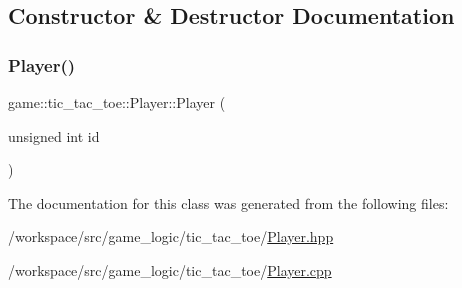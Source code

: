 \subsection{Constructor \& Destructor Documentation}
\mbox{\label{classgame_1_1tic__tac__toe_1_1_player_ac9259561465521842ee71a5a0ebd4896}} 
\subsubsection{\texorpdfstring{Player()}{Player()}}
{\footnotesize\ttfamily game\+::tic\+\_\+tac\+\_\+toe\+::\+Player\+::\+Player (\begin{DoxyParamCaption}\item[{unsigned int}]{id }\end{DoxyParamCaption})\hspace{0.3cm}{\ttfamily [explicit]}}



The documentation for this class was generated from the following files\+:\begin{DoxyCompactItemize}
\item 
/workspace/src/game\+\_\+logic/tic\+\_\+tac\+\_\+toe/\hyperlink{_player_8hpp}{Player.\+hpp}\item 
/workspace/src/game\+\_\+logic/tic\+\_\+tac\+\_\+toe/\hyperlink{_player_8cpp}{Player.\+cpp}\end{DoxyCompactItemize}
